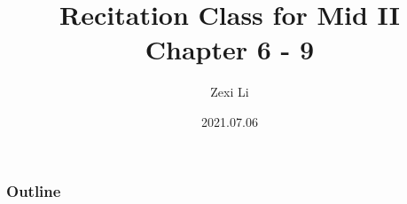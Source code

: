 \documentclass{beamer}
\begin{document}
\renewcommand{\d}{\: \mathrm{d} }
\newcommand{\e}{\mathrm{e}}


\title[] {Recitation Class for Mid II \\ Chapter 6 - 9}

\author[lzx]{Zexi Li}


\date{2021.07.06}

\frame{\titlepage}


\begin{frame}
    \frametitle{Outline}
    \tableofcontents
\end{frame}
\end{document}
